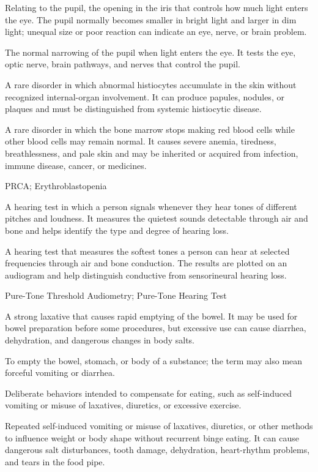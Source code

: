  Relating to the pupil, the opening in the iris that controls how much light enters the eye. The pupil normally becomes smaller in bright light and larger in dim light; unequal size or poor reaction can indicate an eye, nerve, or brain problem.

 The normal narrowing of the pupil when light enters the eye. It tests the eye, optic nerve, brain pathways, and nerves that control the pupil.

 A rare disorder in which abnormal histiocytes accumulate in the skin without recognized internal-organ involvement. It can produce papules, nodules, or plaques and must be distinguished from systemic histiocytic disease.

 A rare disorder in which the bone marrow stops making red blood cells while other blood cells may remain normal. It causes severe anemia, tiredness, breathlessness, and pale skin and may be inherited or acquired from infection, immune disease, cancer, or medicines.

\synonyms
PRCA; Erythroblastopenia

 A hearing test in which a person signals whenever they hear tones of different pitches and loudness. It measures the quietest sounds detectable through air and bone and helps identify the type and degree of hearing loss.

 A hearing test that measures the softest tones a person can hear at selected frequencies through air and bone conduction.
The results are plotted on an audiogram and help distinguish conductive from sensorineural hearing loss.

\synonyms
Pure-Tone Threshold Audiometry; Pure-Tone Hearing Test

 A strong laxative that causes rapid emptying of the bowel. It may be used for bowel preparation before some procedures, but excessive use can cause diarrhea, dehydration, and dangerous changes in body salts.

 To empty the bowel, stomach, or body of a substance; the term may also mean forceful vomiting or diarrhea.

 Deliberate behaviors intended to compensate for eating, such as self-induced vomiting or misuse of laxatives,
diuretics, or excessive exercise.

 Repeated self-induced vomiting or misuse of laxatives, diuretics, or other methods to influence weight or body shape without recurrent binge eating. It can cause dangerous salt disturbances, tooth damage, dehydration, heart-rhythm problems, and tears in the food pipe.

